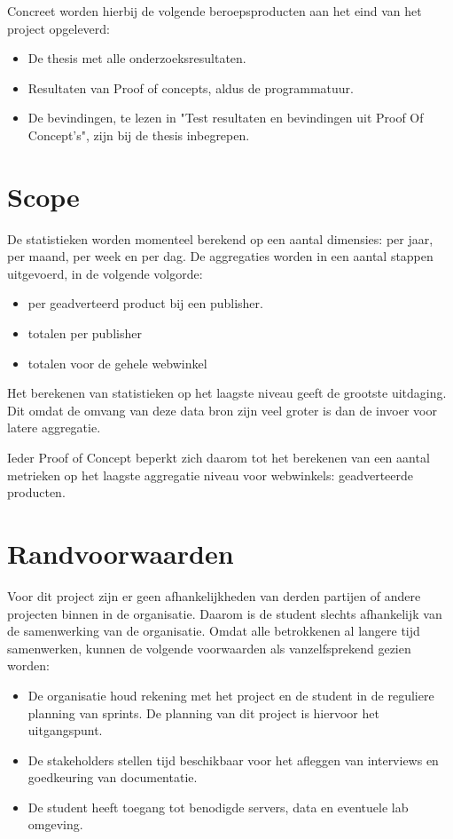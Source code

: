     Concreet worden hierbij de volgende beroepsproducten aan het eind van het project opgeleverd:
    
    \begin{itemize}
    \item De thesis met alle onderzoeksresultaten.
    \item Resultaten van Proof of concepts, aldus de programmatuur.
    \item De bevindingen, te lezen in "Test resultaten en bevindingen uit Proof Of Concept's", zijn bij de thesis inbegrepen.
    \end{itemize}
    
\newpage

\section{Scope}

De statistieken worden momenteel berekend op een aantal dimensies: per jaar, per maand, per week en per dag. De aggregaties worden in een aantal stappen uitgevoerd, in de volgende volgorde:
\begin{itemize}
\item per geadverteerd product bij een publisher.
\item totalen per publisher
\item totalen voor de gehele webwinkel
\end{itemize}
Het berekenen van statistieken op het laagste niveau geeft de grootste uitdaging. Dit omdat de omvang van deze data bron zijn veel groter is dan de invoer voor latere aggregatie.

Ieder Proof of Concept beperkt zich daarom tot het berekenen van een aantal metrieken op het laagste aggregatie niveau voor webwinkels: geadverteerde producten.


\section{Randvoorwaarden}

Voor dit project zijn er geen afhankelijkheden van derden partijen of andere projecten binnen in de organisatie. Daarom is de student slechts afhankelijk van de samenwerking van de organisatie. Omdat alle betrokkenen al langere tijd samenwerken, kunnen de volgende voorwaarden als vanzelfsprekend gezien worden:

\begin{itemize}
    \item De organisatie houd rekening met het project en de student in de reguliere planning van sprints. De planning van dit project is hiervoor het uitgangspunt.
    \item De stakeholders stellen tijd beschikbaar voor het afleggen van interviews en goedkeuring van documentatie.
    \item De student heeft toegang tot benodigde servers, data en eventuele lab omgeving.
\end{itemize}

